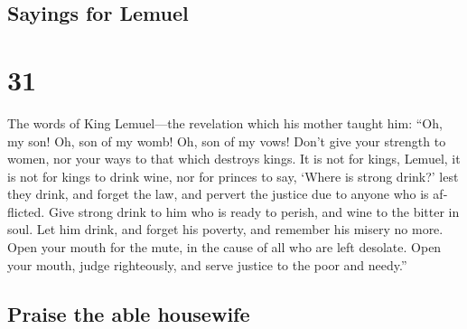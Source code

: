\begin{paracol}{2}
\begin{otherlanguage}{english}
\hypertarget{sayings-for-lemuel}{%
\subsection{Sayings for Lemuel}\label{sayings-for-lemuel}}

\hypertarget{section-61}{%
\section{31}\label{section-61}}

 The words of King Lemuel---the revelation which his
mother taught him:  ``Oh, my son! Oh, son of my womb! Oh,
son of my vows!  Don't give your strength to women, nor
your ways to that which destroys kings.  It is not for
kings, Lemuel, it is not for kings to drink wine, nor for princes to
say, `Where is strong drink?'  lest they drink, and forget
the law, and pervert the justice due to anyone who is afflicted.
 Give strong drink to him who is ready to perish, and wine
to the bitter in soul.  Let him drink, and forget his
poverty, and remember his misery no more.  Open your mouth
for the mute, in the cause of all who are left desolate. 
Open your mouth, judge righteously, and serve justice to the poor and
needy.''

\hypertarget{praise-the-able-housewife}{%
\subsection{Praise the able housewife}\label{praise-the-able-housewife}}


\end{otherlanguage}
\end{paracol}
